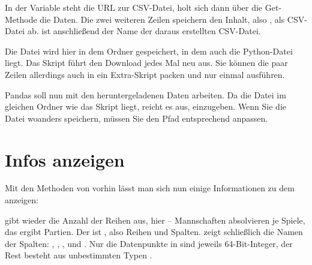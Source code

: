 \medskip


\PYTHON{}



\PYTHON{}





\medskip




In der Variable  steht die URL zur CSV-Datei,  holt sich dann über die Get-Methode die Daten. Die zwei weiteren Zeilen speichern den Inhalt, also , als CSV-Datei ab.  ist anschließend der Name der daraus erstellten CSV-Datei.

Die Datei wird hier in dem Ordner gespeichert, in dem auch die Python-Datei liegt. Das Skript führt den Download jedes Mal neu aus. Sie können die paar Zeilen allerdings auch in ein Extra-Skript packen und nur einmal ausführen.

Pandas soll nun mit den heruntergeladenen Daten arbeiten. Da die Datei im gleichen Ordner wie das Skript liegt, reicht es aus,  einzugeben. Wenn Sie die Datei woanders speichern, müssen Sie den Pfad entsprechend anpassen.

\section{Infos anzeigen}



Mit den Methoden von vorhin lässt man sich nun einige Informationen zu dem  anzeigen:

\medskip




\medskip

 gibt wieder die Anzahl der Reihen aus, hier  --  Mannschaften absolvieren je  Spiele, das ergibt  Partien. Der  ist , also  Reihen und  Spalten.  zeigt schließlich die Namen der Spalten: , , ,  und . Nur die Datenpunkte in  sind jeweils 64-Bit-Integer, der Rest besteht aus unbestimmten Typen .

